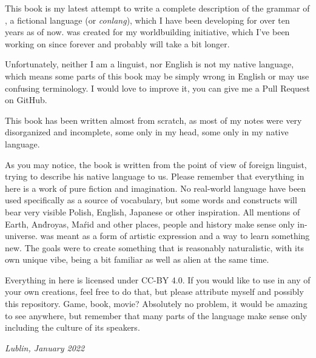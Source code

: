 This book is my latest attempt to write a complete description of the grammar of
\andro, a fictional language (or \emph{conlang}), which I have been developing
for over ten years as of now. \andro was created for my worldbuilding
initiative, which I've been working on since forever and probably will take a
bit longer.

Unfortunately, neither I am a linguist, nor English is not my native language,
which means some parts of this book may be simply wrong in English or may use
confusing terminology. I would love to improve it, you can give me a Pull
Request on GitHub.

This book has been written almost from scratch, as most of my notes were very
disorganized and incomplete, some only in my head, some only in my native
language.

As you may notice, the book is written from the point of view of foreign
linguist, trying to describe his native language to us. Please remember that
everything in here is a work of pure fiction and imagination. No real-world
language have been used specifically as a source of vocabulary, but some words
and constructs will bear very visible Polish, English, Japanese or other
inspiration. All mentions of Earth, And́royas, Maŕid and other places, people
and history make sense only in-universe. \andro was meant as a form of artistic
expression and a way to learn something new. The goals were to create something
that is reasonably naturalistic, with its own unique vibe, being a bit familiar
as well as alien at the same time.

Everything in here is licensed under \textsc{CC-BY 4.0}. If you would like to
use \andro in any of your own creations, feel free to do that, but please
attribute myself and possibly this repository. Game, book, movie? Absolutely no
problem, it would be amazing to see \andro anywhere, but remember that many
parts of the language make sense only including the culture of its speakers.

\begin{flushright}\itshape\footnotesize
    Lublin, January 2022
\end{flushright}